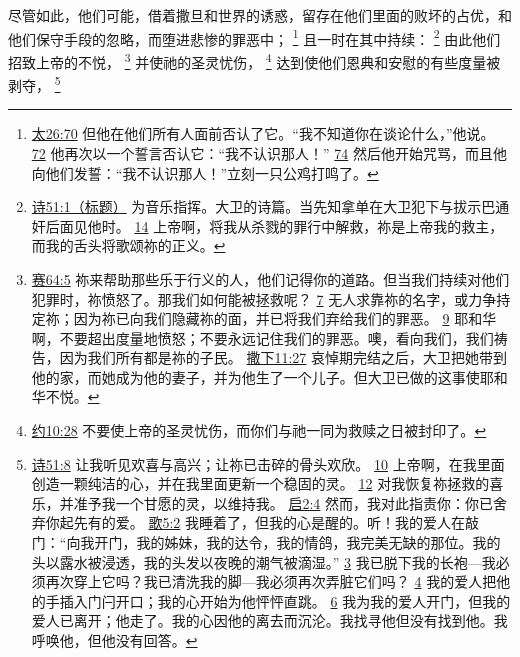 \documentclass[12pt, a4paper, oneside]{ctexart}
\newcounter{parnum}[section]
\newcommand{\N}{%
   \noindent\refstepcounter{parnum}%
    \makebox[\parindent][l]{\textbf{\arabic{parnum}.}}}
\begin{document}
\N 尽管如此，他们可能，借着撒旦和世界的诱惑，留存在他们里面的败坏的占优，和他们保守手段的忽略，而堕进悲惨的罪恶中；
	\footnote {
		\href{https://biblehub.com/matthew/26-70.htm}{太26:70} 但他在他们所有人面前否认了它。“我不知道你在谈论什么，”他说。
		\href{https://biblehub.com/matthew/26-72.htm}{72} 他再次以一个誓言否认它：“我不认识那人！”
		\href{https://biblehub.com/matthew/26-74.htm}{74} 然后他开始咒骂，而且他向他们发誓：“我不认识那人！”立刻一只公鸡打鸣了。
	}
	且一时在其中持续：
	\footnote {
		\href{https://biblehub.com/psalms/51-1.htm}{诗51:1（标题）} 为音乐指挥。大卫的诗篇。当先知拿单在大卫犯下与拔示巴通奸后面见他时。
		\href{https://biblehub.com/psalms/51-14.htm}{14} 上帝啊，将我从杀戮的罪行中解救，祢是上帝我的救主，而我的舌头将歌颂祢的正义。
	}
	由此他们招致上帝的不悦，
	\footnote {
		\href{https://biblehub.com/isaiah/64-5.htm}{赛64:5} 祢来帮助那些乐于行义的人，他们记得你的道路。但当我们持续对他们犯罪时，祢愤怒了。那我们如何能被拯救呢？
		\href{https://biblehub.com/isaiah/64-7.htm}{7} 无人求靠祢的名字，或力争持定祢；因为祢已向我们隐藏祢的面，并已将我们弃给我们的罪恶。
		\href{https://biblehub.com/isaiah/64-9.htm}{9} 耶和华啊，不要超出度量地愤怒；不要永远记住我们的罪恶。噢，看向我们，我们祷告，因为我们所有都是祢的子民。
		\href{https://biblehub.com/2_samuel/11-27.htm}{撒下11:27} 哀悼期完结之后，大卫把她带到他的家，而她成为他的妻子，并为他生了一个儿子。但大卫已做的这事使耶和华不悦。
	}
	并使祂的圣灵忧伤，
	\footnote {
		\href{https://biblehub.com/ephesians/4-30.htm}{约10:28} 不要使上帝的圣灵忧伤，而你们与祂一同为救赎之日被封印了。
	}
	达到使他们恩典和安慰的有些度量被剥夺，
	\footnote {
		\href{https://biblehub.com/psalms/51-8.htm}{诗51:8} 让我听见欢喜与高兴；让祢已击碎的骨头欢欣。
		\href{https://biblehub.com/psalms/51-10.htm}{10} 上帝啊，在我里面创造一颗纯洁的心，并在我里面更新一个稳固的灵。
		\href{https://biblehub.com/psalms/51-12.htm}{12} 对我恢复祢拯救的喜乐，并准予我一个甘愿的灵，以维持我。
		\href{https://biblehub.com/revelation/2-4.htm}{启2:4} 然而，我对此指责你：你已舍弃你起先有的爱。
		\href{https://biblehub.com/songs/5-2.htm}{歌5:2} 我睡着了，但我的心是醒的。听！我的爱人在敲门：“向我开门，我的姊妹，我的达令，我的情鸽，我完美无缺的那位。我的头以露水被浸透，我的头发以夜晚的潮气被滴湿。”
		\href{https://biblehub.com/songs/5-3.htm}{3} 我已脱下我的长袍---我必须再次穿上它吗？我已清洗我的脚---我必须再次弄脏它们吗？
		\href{https://biblehub.com/songs/5-4.htm}{4} 我的爱人把他的手插入门闩开口；我的心开始为他怦怦直跳。
		\href{https://biblehub.com/songs/5-6.htm}{6} 我为我的爱人开门，但我的爱人已离开；他走了。我的心因他的离去而沉沦。我找寻他但没有找到他。我呼唤他，但他没有回答。
	}
\end{document}
